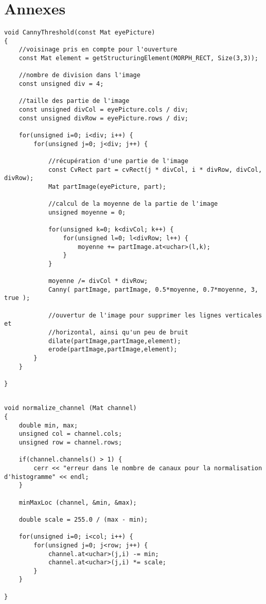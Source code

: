 \section*{Annexes}

\begin{lstlisting}[caption=Application du filtre de Canny sur des parties de l'image avec la moyenne des niveaux de gris]
void CannyThreshold(const Mat eyePicture)
{
    //voisinage pris en compte pour l'ouverture
    const Mat element = getStructuringElement(MORPH_RECT, Size(3,3));

    //nombre de division dans l'image
    const unsigned div = 4;

    //taille des partie de l'image
    const unsigned divCol = eyePicture.cols / div;
    const unsigned divRow = eyePicture.rows / div;

    for(unsigned i=0; i<div; i++) {
        for(unsigned j=0; j<div; j++) {

            //récupération d'une partie de l'image
            const CvRect part = cvRect(j * divCol, i * divRow, divCol, divRow);
            Mat partImage(eyePicture, part);

            //calcul de la moyenne de la partie de l'image
            unsigned moyenne = 0;

            for(unsigned k=0; k<divCol; k++) {
                for(unsigned l=0; l<divRow; l++) {
                    moyenne += partImage.at<uchar>(l,k);
                }
            }

            moyenne /= divCol * divRow;
            Canny( partImage, partImage, 0.5*moyenne, 0.7*moyenne, 3, true );

            //ouvertur de l'image pour supprimer les lignes verticales et
            //horizontal, ainsi qu'un peu de bruit
            dilate(partImage,partImage,element);
            erode(partImage,partImage,element);
        }
    }

}
 
\end{lstlisting}

\begin{lstlisting}[caption=Normalisation d'une chaine d'une image]
 void normalize_channel (Mat channel)
{
    double min, max;
    unsigned col = channel.cols;
    unsigned row = channel.rows;

    if(channel.channels() > 1) {
        cerr << "erreur dans le nombre de canaux pour la normalisation d'histogramme" << endl;
    }

    minMaxLoc (channel, &min, &max);

    double scale = 255.0 / (max - min);

    for(unsigned i=0; i<col; i++) {
        for(unsigned j=0; j<row; j++) {
            channel.at<uchar>(j,i) -= min;
            channel.at<uchar>(j,i) *= scale;
        }
    }

}
\end{lstlisting}


\newpage